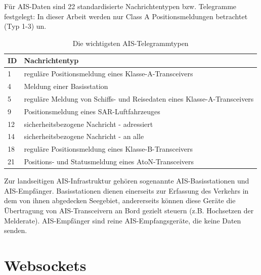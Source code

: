 Für AIS-Daten sind 22 standardisierte Nachrichtentypen bzw. Telegramme festgelegt:
In dieser Arbeit werden nur Class A Positionsmeldungen betrachtet (Typ 1-3) un.
\begin{table}[!hbt]
\centering
\begin{tabular}{|l|l|}\hline
ID&Nachrichtentyp\\\hline\hline
1& reguläre Positionsmeldung eines Klasse-A-Transceivers\\
4 & Meldung einer Basisstation\\
5& reguläre Meldung von Schiffs- und Reisedaten eines Klasse-A-Transceivers\\
9 & Positionsmeldung eines SAR-Luftfahrzeuges\\
12& sicherheitsbezogene Nachricht - adressiert\\
14& sicherheitsbezogene Nachricht - an alle\\
18& reguläre Positionsmeldung eines Klasse-B-Transceivers\\
21& Positions- und Statusmeldung eines AtoN-Transceivers\\\hline
\end{tabular}
\caption[Die wichtigsten AIS-Telegrammtypen] {Die wichtigsten AIS-Telegrammtypen}
\end{table}

Zur landseitigen AIS-Infrastruktur gehören sogenannte AIS-Basisstationen und AIS-Empfänger. Basisstationen dienen einerseits zur Erfassung des Verkehrs in dem von ihnen abgedecken Seegebiet, andererseits können diese Geräte die Übertragung von AIS-Transceivern an Bord gezielt steuern (z.B. Hochsetzen der Melderate). AIS-Empfänger sind reine AIS-Empfangsgeräte, die keine Daten senden.\\


\section{Websockets}\label{s.Websockets}
